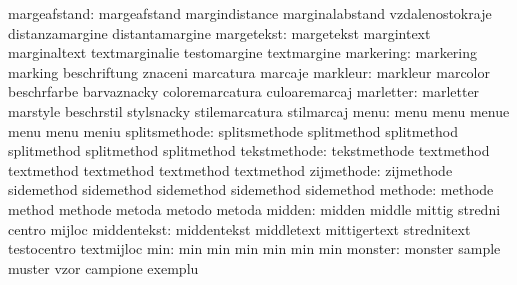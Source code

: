              margeafstand: margeafstand              margindistance
                           marginalabstand           vzdalenostokraje
                           distanzamargine           distantamargine
               margetekst: margetekst                margintext
                           marginaltext              textmarginalie
                           testomargine              textmargine
                markering: markering                 marking
                           beschriftung              znaceni
                           marcatura                 marcaje
                 markleur: markleur                  marcolor
                           beschrfarbe               barvaznacky
                           coloremarcatura           culoaremarcaj
                marletter: marletter                 marstyle
                           beschrstil                stylsnacky
                           stilemarcatura            stilmarcaj
                     menu: menu                      menu
                           menue                     menu
                           menu                      meniu
            splitsmethode: splitsmethode             splitmethod
                           splitmethod               splitmethod
                           splitmethod               splitmethod
             tekstmethode: tekstmethode              textmethod
                           textmethod                textmethod
                           textmethod                textmethod
               zijmethode: zijmethode                sidemethod
                           sidemethod                sidemethod
                           sidemethod                sidemethod
                  methode: methode                   method
                           methode                   metoda
                           metodo                    metoda
                   midden: midden                    middle
                           mittig                    stredni
                           centro                    mijloc %
              middentekst: middentekst               middletext
                           mittigertext              strednitext
                           testocentro               textmijloc %
                      min: min                       min
                           min                       min
                           min                       min
                  monster: monster                   sample
                           muster                    vzor
                           campione                  exemplu
